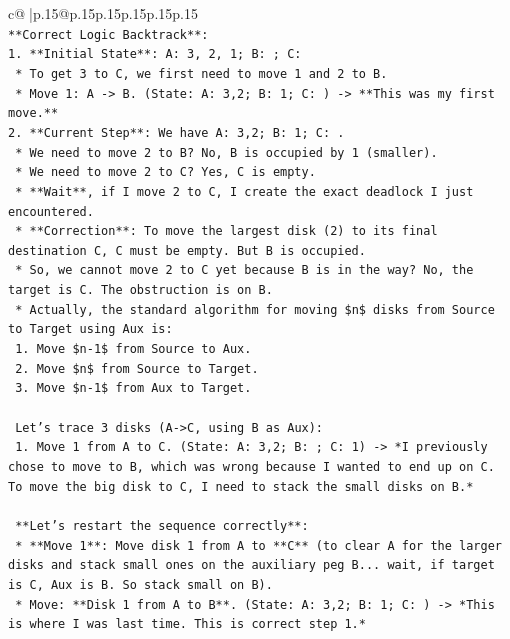 \documentclass{article}
\begin{document}
{\begin{supertabular}{c@{$\;$}|p{.15\linewidth}@{}p{.15\linewidth}p{.15\linewidth}p{.15\linewidth}p{.15\linewidth}p{.15\linewidth}}
{{{\\ 
\texttt{**Correct Logic Backtrack**:} \\
\texttt{1.  **Initial State**: A: 3, 2, 1; B: ; C:} \\
\texttt{    *   To get 3 to C, we first need to move 1 and 2 to B.} \\
\texttt{    *   Move 1: A {-}> B. (State: A: 3,2; B: 1; C: ) {-}> **This was my first move.**} \\
\texttt{2.  **Current Step**: We have A: 3,2; B: 1; C: .} \\
\texttt{    *   We need to move 2 to B? No, B is occupied by 1 (smaller).} \\
\texttt{    *   We need to move 2 to C? Yes, C is empty.} \\
\texttt{    *   **Wait**, if I move 2 to C, I create the exact deadlock I just encountered.} \\
\texttt{    *   **Correction**: To move the largest disk (2) to its final destination C, C must be empty. But B is occupied.} \\
\texttt{    *   So, we cannot move 2 to C yet because B is in the way? No, the target is C. The obstruction is on B.} \\
\texttt{    *   Actually, the standard algorithm for moving \$n\$ disks from Source to Target using Aux is:} \\
\texttt{        1. Move \$n{-}1\$ from Source to Aux.} \\
\texttt{        2. Move \$n\$ from Source to Target.} \\
\texttt{        3. Move \$n{-}1\$ from Aux to Target.} \\
\\ 
\texttt{    Let's trace 3 disks (A{-}>C, using B as Aux):} \\
\texttt{    1. Move 1 from A to C. (State: A: 3,2; B: ; C: 1) {-}> *I previously chose to move to B, which was wrong because I wanted to end up on C. To move the big disk to C, I need to stack the small disks on B.*} \\
\\ 
\texttt{    **Let's restart the sequence correctly**:} \\
\texttt{    *   **Move 1**: Move disk 1 from A to **C** (to clear A for the larger disks and stack small ones on the auxiliary peg B... wait, if target is C, Aux is B. So stack small on B).} \\
\texttt{        *   Move: **Disk 1 from A to B**. (State: A: 3,2; B: 1; C: ) {-}> *This is where I was last time. This is correct step 1.*} \\
}}}
\end{supertabular}}
\end{document}
